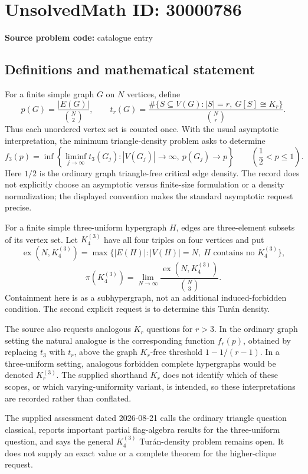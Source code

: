 \documentclass[11pt]{article}
\begin{document}
\section*{UnsolvedMath ID: 30000786}
\textbf{Source problem code:} catalogue entry
\subsection{Definitions and mathematical statement}
For a finite simple graph \(G\) on \(N\) vertices, define
\[
 p(G)=\frac{|E(G)|}{\binom N2},\qquad
 t_r(G)=\frac{\#\{S\subseteq V(G):|S|=r,\ G[S]\cong K_r\}}{\binom Nr}.
\]
Thus each unordered vertex set is counted once. With the usual asymptotic interpretation, the minimum triangle-density problem asks to determine
\[
 f_3(p)=\inf\left\{\liminf_{j\to\infty}t_3(G_j):
 |V(G_j)|\to\infty,\ p(G_j)\to p\right\}
 \qquad\left(\frac12<p\leq1\right).
\]
Here \(1/2\) is the ordinary graph triangle-free critical edge density. The record does not explicitly choose an asymptotic versus finite-size formulation or a density normalization; the displayed convention makes the standard asymptotic request precise.

For a finite simple three-uniform hypergraph \(H\), edges are three-element subsets of its vertex set. Let \(K_4^{(3)}\) have all four triples on four vertices and put
\[
 \operatorname{ex}(N,K_4^{(3)})
 =\max\{|E(H)|:|V(H)|=N,\ H\text{ contains no }K_4^{(3)}\},
\]
\[
 \pi(K_4^{(3)})
 =\lim_{N\to\infty}\frac{\operatorname{ex}(N,K_4^{(3)})}{\binom N3}.
\]
Containment here is as a subhypergraph, not an additional induced-forbidden condition. The second explicit request is to determine this Tur\'an density.

The source also requests analogous \(K_r\) questions for \(r>3\). In the ordinary graph setting the natural analogue is the corresponding function \(f_r(p)\), obtained by replacing \(t_3\) with \(t_r\), above the graph \(K_r\)-free threshold \(1-1/(r-1)\). In a three-uniform setting, analogous forbidden complete hypergraphs would be denoted \(K_r^{(3)}\). The supplied shorthand \(K_r\) does not identify which of these scopes, or which varying-uniformity variant, is intended, so these interpretations are recorded rather than conflated.

The supplied assessment dated 2026-08-21 calls the ordinary triangle question classical, reports important partial flag-algebra results for the three-uniform question, and says the general \(K_4^{(3)}\) Tur\'an-density problem remains open. It does not supply an exact value or a complete theorem for the higher-clique request.
\end{document}

